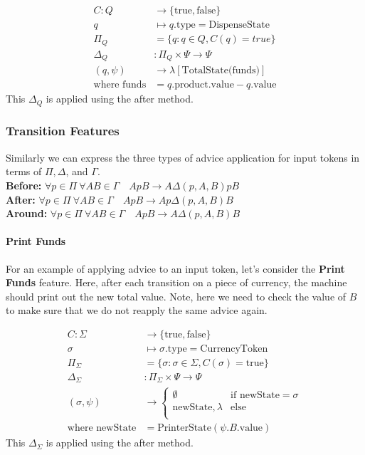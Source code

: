 \documentclass[sigplan,anonymous,review]{acmart}
\begin{document}
\begin{align*}
C: Q &\rightarrow \{\mathrm{true},\mathrm{false}\}\\
q &\mapsto q.\text{type} = \text{DispenseState} \\
\Pi_Q &= \{q: q \in Q, C(q) = true\}\\
\Delta_Q &: \Pi_Q \times \Psi \rightarrow \Psi\\
(q, \psi) &\rightarrow \lambda[\text{TotalState(funds)}] \\
\text{where funds} &= q.\text{product.value} - q.\text{value}
\end{align*}
This $\Delta_Q$ is applied using the after method.

\subsubsection{Transition Features}
Similarly we can express the three types of advice application for input tokens in terms of $\Pi, \Delta$, and $\Gamma$.\\
\textbf{Before:} $\forall p \in \Pi \ \forall AB \in \Gamma \quad A p B \rightarrow A \Delta(p, A, B)pB$\\
\textbf{After:} $\forall p \in \Pi \ \forall AB \in \Gamma \quad A p B \rightarrow A p \Delta(p, A, B)B$\\
\textbf{Around:} $\forall p \in \Pi \ \forall AB \in \Gamma \quad A p B \rightarrow A  \Delta(p, A, B)B$

\paragraph{Print Funds} For an example of applying advice to an input token, let's consider the \textbf{Print Funds} feature. Here, after each transition on a piece of currency, the machine should print out the new total value. Note, here we need to check the value of $B$ to make sure that we do not reapply the same advice again.

\begin{align*}
C: \Sigma &\rightarrow \{\mathrm{true},\mathrm{false}\}\\
\sigma &\mapsto \sigma.\text{type} = \text{CurrencyToken} \\
\Pi_\Sigma &= \{\sigma: \sigma \in \Sigma, C(\sigma) = \mathrm{true}\}\\
\Delta_\Sigma &: \Pi_\Sigma \times \Psi \rightarrow \Psi\\
(\sigma, \psi) &\rightarrow \begin{cases}
    \emptyset & \text{if newState} = \sigma\\
    \text{newState}, \lambda & \text{else}\\
\end{cases}\\
\text{where newState} &= \text{PrinterState}(\psi.B.\text{value})
\end{align*}
This $\Delta_\Sigma$ is applied using the after method.
\end{document}
